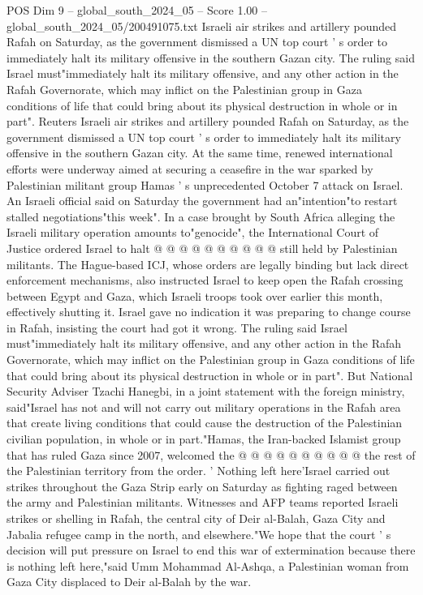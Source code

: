 \begin{textsample}{POS Dim 9 – global\_south\_2024\_05 – Score 1.00 – global\_south\_2024\_05/200491075.txt}  \label{ex:f9_pos_121}
Israeli air strikes and artillery pounded Rafah on Saturday, as the government dismissed a UN top court ' s order to immediately halt its military offensive in the southern Gazan city.
The ruling said Israel must"immediately halt its military offensive, and any other action in the Rafah Governorate, which may inflict on the Palestinian group in Gaza conditions of life that could bring about its physical destruction in whole or in part".
Reuters Israeli air strikes and artillery pounded Rafah on Saturday, as the government dismissed a UN top court ' s order to immediately halt its military offensive in the southern Gazan city.
At the same time, renewed international efforts were underway aimed at securing a ceasefire in the war sparked by Palestinian militant group Hamas ' s unprecedented October 7 attack on Israel.
An Israeli official said on Saturday the government had an"intention"to restart stalled negotiations"this week".
In a case brought by South Africa alleging the Israeli military operation amounts to"genocide", the International Court of Justice ordered Israel to halt @ @ @ @ @ @ @ @ @ @ still held by Palestinian militants.
The Hague-based ICJ, whose orders are legally binding but lack direct enforcement mechanisms, also instructed Israel to keep open the Rafah crossing between Egypt and Gaza, which Israeli troops took over earlier this month, effectively shutting it.
Israel gave no indication it was preparing to change course in Rafah, insisting the court had got it wrong.
The ruling said Israel must"immediately halt its military offensive, and any other action in the Rafah Governorate, which may inflict on the Palestinian group in Gaza conditions of life that could bring about its physical destruction in whole or in part".
But National Security Adviser Tzachi Hanegbi, in a joint statement with the foreign ministry, said"Israel has not and will not carry out military operations in the Rafah area that create living conditions that could cause the destruction of the Palestinian civilian population, in whole or in part."Hamas, the Iran-backed Islamist group that has ruled Gaza since 2007, welcomed the @ @ @ @ @ @ @ @ @ @ the rest of the Palestinian territory from the order. ' Nothing left here'Israel carried out strikes throughout the Gaza Strip early on Saturday as fighting raged between the army and Palestinian militants.
Witnesses and AFP teams reported Israeli strikes or shelling in Rafah, the central city of Deir al-Balah, Gaza City and Jabalia refugee camp in the north, and elsewhere."We hope that the court ' s decision will put pressure on Israel to end this war of extermination because there is nothing left here,"said Umm Mohammad Al-Ashqa, a Palestinian woman from Gaza City displaced to Deir al-Balah by the war.

\end{textsample}
